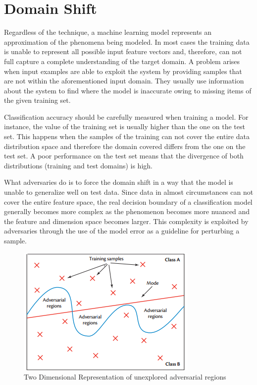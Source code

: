 \section{Domain Shift}

Regardless of the technique, a machine learning model represents an approximation of the phenomena being modeled. In most cases the training data is unable to represent all possible input feature vectors and, therefore, can not full capture a complete understanding of the target domain. A problem arises when input examples are able to exploit the system by providing samples that are not within the aforementioned input domain. They usually use information about the system to find where the model is inaccurate owing to missing items of the given training set.

Classification accuracy should be carefully measured when training a model. For instance, the value of the training set is usually higher than the one on the test set. This happens when the samples of the training can not cover the entire data distribution space and therefore the domain covered differs from the one on the test set. A poor performance on the test set means that the divergence of both distributions (training and test domains) is high. 

What adversaries do is to force the domain shift in a way that the model is unable to generalize well on test data. Since data in almost circumstances can not cover the entire feature space, the real decision boundary of a classification model generally becomes more complex as the phenomenon becomes more nuanced and the feature and dimension space becomes larger. This complexity is exploited by adversaries through the use of the model error as a guideline for perturbing a sample.

\begin{figure}[!h]
\centering
	\includegraphics[scale=1.0]{adv_space.png}
\caption{Two Dimensional Representation of unexplored adversarial regions \cite{papernot_2017}}
\label{fig:adv_space}
\end{figure}


